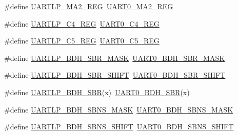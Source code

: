 \begin{DoxyCompactItemize}
\#define \hyperlink{group___backward___compatibility___symbols_ga88eb460f480938f175efb58b54db515c}{U\+A\+R\+T\+L\+P\+\_\+\+M\+A2\+\_\+\+R\+EG}~\hyperlink{group___u_a_r_t0___register___accessor___macros_ga94d24feeb28228679ff183703948cd1c}{U\+A\+R\+T0\+\_\+\+M\+A2\+\_\+\+R\+EG}
\item 
\#define \hyperlink{group___backward___compatibility___symbols_gaf72e56d7ea7d8a9c232d8ec3660b7451}{U\+A\+R\+T\+L\+P\+\_\+\+C4\+\_\+\+R\+EG}~\hyperlink{group___u_a_r_t0___register___accessor___macros_ga3f4e82f4aa7ddbd86f04a6acff85b938}{U\+A\+R\+T0\+\_\+\+C4\+\_\+\+R\+EG}
\item 
\#define \hyperlink{group___backward___compatibility___symbols_gabc0ed230faba55a9874ca37a592326b3}{U\+A\+R\+T\+L\+P\+\_\+\+C5\+\_\+\+R\+EG}~\hyperlink{group___u_a_r_t0___register___accessor___macros_ga6ada2400c47eb55801b267941220c48a}{U\+A\+R\+T0\+\_\+\+C5\+\_\+\+R\+EG}
\item 
\#define \hyperlink{group___backward___compatibility___symbols_ga0654a0aae3440ab5346eb9ecc4bd86d6}{U\+A\+R\+T\+L\+P\+\_\+\+B\+D\+H\+\_\+\+S\+B\+R\+\_\+\+M\+A\+SK}~\hyperlink{group___u_a_r_t0___register___masks_ga594b77e6abc9054650d85c9d7e2c4cfa}{U\+A\+R\+T0\+\_\+\+B\+D\+H\+\_\+\+S\+B\+R\+\_\+\+M\+A\+SK}
\item 
\#define \hyperlink{group___backward___compatibility___symbols_ga564ff56e5370588f01e2bc1a4e14d191}{U\+A\+R\+T\+L\+P\+\_\+\+B\+D\+H\+\_\+\+S\+B\+R\+\_\+\+S\+H\+I\+FT}~\hyperlink{group___u_a_r_t0___register___masks_ga5262e2ab11a18782a8cceb9a63affe27}{U\+A\+R\+T0\+\_\+\+B\+D\+H\+\_\+\+S\+B\+R\+\_\+\+S\+H\+I\+FT}
\item 
\#define \hyperlink{group___backward___compatibility___symbols_ga75784a3b6f6d3df174b6356880ae8e8f}{U\+A\+R\+T\+L\+P\+\_\+\+B\+D\+H\+\_\+\+S\+BR}(x)~\hyperlink{group___u_a_r_t0___register___masks_gaaab64986eac86f67040cce306b41e610}{U\+A\+R\+T0\+\_\+\+B\+D\+H\+\_\+\+S\+BR}(x)
\item 
\#define \hyperlink{group___backward___compatibility___symbols_ga6fee92bf869c5fe7376bd4aca728d4bc}{U\+A\+R\+T\+L\+P\+\_\+\+B\+D\+H\+\_\+\+S\+B\+N\+S\+\_\+\+M\+A\+SK}~\hyperlink{group___u_a_r_t0___register___masks_gaed905f161d823efa3beca3e0e93d39ff}{U\+A\+R\+T0\+\_\+\+B\+D\+H\+\_\+\+S\+B\+N\+S\+\_\+\+M\+A\+SK}
\item 
\#define \hyperlink{group___backward___compatibility___symbols_gaaff5e47bbe5fd72ca58ec73c448a1962}{U\+A\+R\+T\+L\+P\+\_\+\+B\+D\+H\+\_\+\+S\+B\+N\+S\+\_\+\+S\+H\+I\+FT}~\hyperlink{group___u_a_r_t0___register___masks_gad8909b0c50ce1d7436a2bdb2d99cce1a}{U\+A\+R\+T0\+\_\+\+B\+D\+H\+\_\+\+S\+B\+N\+S\+\_\+\+S\+H\+I\+FT}

\end{DoxyCompactItemize}
